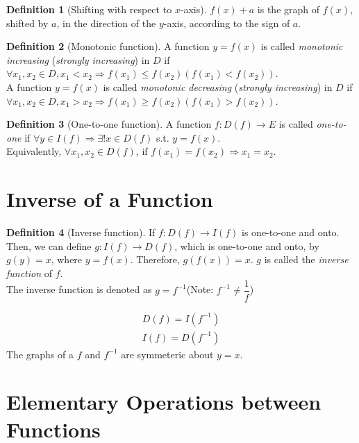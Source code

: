 \documentclass[fleqn]{article}
\theoremstyle{definition}
\newtheorem{definition}{Definition}
\theoremstyle{theorem}
\theoremstyle{remark}
\begin{document}
\begin{definition}[Shifting with respect to $x$-axis]
	$f(x) + a$ is the graph of $f(x)$, shifted by $a$, in the direction of the $y$-axis, according to the sign of $a$. \\
\end{definition}

\begin{definition}[Monotonic function]
	A function $y = f(x)$ is called \emph{monotonic increasing} (\emph{strongly increasing}) in $D$ if $\forall x_1, x_2 \in D, x_1 < x_2 \Rightarrow f(x_1) \leq f(x_2) (f(x_1) < f(x_2))$. \\
	A function $y = f(x)$ is called \emph{monotonic decreasing} (\emph{strongly increasing}) in $D$ if $\forall x_1, x_2 \in D, x_1 > x_2 \Rightarrow f(x_1) \geq f(x_2) (f(x_1) > f(x_2))$. 
\end{definition}

\begin{definition}[One-to-one function]
	A function $f : D(f) \rightarrow E$ is called \emph{one-to-one} if $\forall y \in I(f) \Rightarrow \exists ! x \in D(f)$ s.t. $y = f(x)$. \\
	Equivalently, $\forall x_1, x_2 \in D(f)$, if $f(x_1) = f(x_2) \Rightarrow x_1 = x_2$.\\
\end{definition}

\section{Inverse of a Function}

\begin{definition}[Inverse function]
	If $f : D(f) \rightarrow I(f)$ is one-to-one and onto. Then, we can define $g : I(f) \rightarrow D(f)$, which is one-to-one and onto, by $g(y) = x$, where $y = f(x)$. Therefore, $g(f(x)) = x$. $g$ is called the \emph{inverse function} of $f$. \\
	The inverse function is denoted as $g = f^{-1}$(Note: $f^{-1} \neq \dfrac{1}{f}$)
\end{definition}
\begin{align}
	D(f) = I(f^{-1}) \label{Image of inverse}\\
	I(f) = D(f^{-1}) \label{Domain of inverse}
\end{align}
The graphs of a $f$ and $f^{-1}$ are symmeteric about $y=x$.

\section{Elementary Operations between Functions}
\end{document}

